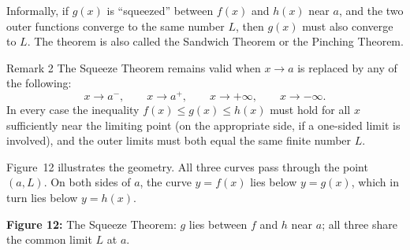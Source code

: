 Informally, if \(g(x)\) is ``squeezed'' between \(f(x)\) and \(h(x)\) near \(a\), and the two outer functions converge to the same number \(L\), then \(g(x)\) must also converge to \(L\). The theorem is also called the Sandwich Theorem or the Pinching Theorem.

\begin{remarkbox}{Remark 2}
The Squeeze Theorem remains valid when \(x \to a\) is replaced by any of the following:
\[
x \to a^{-},\qquad
x \to a^{+},\qquad
x \to +\infty,\qquad
x \to -\infty.
\]
In every case the inequality \(f(x) \leq g(x) \leq h(x)\) must hold for all \(x\) sufficiently near the limiting point (on the appropriate side, if a one-sided limit is involved), and the outer limits must both equal the same finite number \(L\).
\end{remarkbox}

Figure~12 illustrates the geometry. All three curves pass through the point \((a, L)\). On both sides of \(a\), the curve \(y = f(x)\) lies below \(y = g(x)\), which in turn lies below \(y = h(x)\).

\begin{center}

\smallskip
\textbf{Figure 12:} The Squeeze Theorem: \(g\) lies between \(f\) and \(h\) near \(a\); all three share the common limit \(L\) at \(a\).
\end{center}

\bigskip

